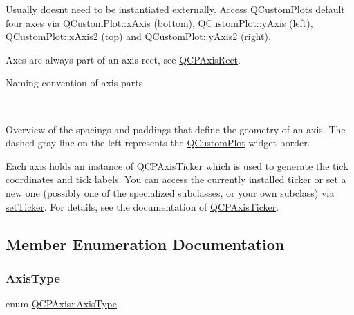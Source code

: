 Usually doesn\textquotesingle{}t need to be instantiated externally. Access Q\+Custom\+Plot\textquotesingle{}s default four axes via \mbox{\hyperlink{class_q_custom_plot_a9a79cd0158a4c7f30cbc702f0fd800e4}{Q\+Custom\+Plot\+::x\+Axis}} (bottom), \mbox{\hyperlink{class_q_custom_plot_af6fea5679725b152c14facd920b19367}{Q\+Custom\+Plot\+::y\+Axis}} (left), \mbox{\hyperlink{class_q_custom_plot_ada41599f22cad901c030f3dcbdd82fd9}{Q\+Custom\+Plot\+::x\+Axis2}} (top) and \mbox{\hyperlink{class_q_custom_plot_af13fdc5bce7d0fabd640f13ba805c0b7}{Q\+Custom\+Plot\+::y\+Axis2}} (right).

Axes are always part of an axis rect, see \mbox{\hyperlink{class_q_c_p_axis_rect}{Q\+C\+P\+Axis\+Rect}}.  \begin{center}Naming convention of axis parts\end{center}  ~\newline


 \begin{center}Overview of the spacings and paddings that define the geometry of an axis. The dashed gray line on the left represents the \mbox{\hyperlink{class_q_custom_plot}{Q\+Custom\+Plot}} widget border.\end{center} 

Each axis holds an instance of \mbox{\hyperlink{class_q_c_p_axis_ticker}{Q\+C\+P\+Axis\+Ticker}} which is used to generate the tick coordinates and tick labels. You can access the currently installed \mbox{\hyperlink{class_q_c_p_axis_a7b7a27151be8235059e1294f73ecf615}{ticker}} or set a new one (possibly one of the specialized subclasses, or your own subclass) via \mbox{\hyperlink{class_q_c_p_axis_a4ee03fcd2c74d05cd1a419b9af5cfbdc}{set\+Ticker}}. For details, see the documentation of \mbox{\hyperlink{class_q_c_p_axis_ticker}{Q\+C\+P\+Axis\+Ticker}}. 

\subsection{Member Enumeration Documentation}
\mbox{\label{class_q_c_p_axis_ae2bcc1728b382f10f064612b368bc18a}} 
\subsubsection{\texorpdfstring{AxisType}{AxisType}}
{\footnotesize\ttfamily enum \mbox{\hyperlink{class_q_c_p_axis_ae2bcc1728b382f10f064612b368bc18a}{Q\+C\+P\+Axis\+::\+Axis\+Type}}}

